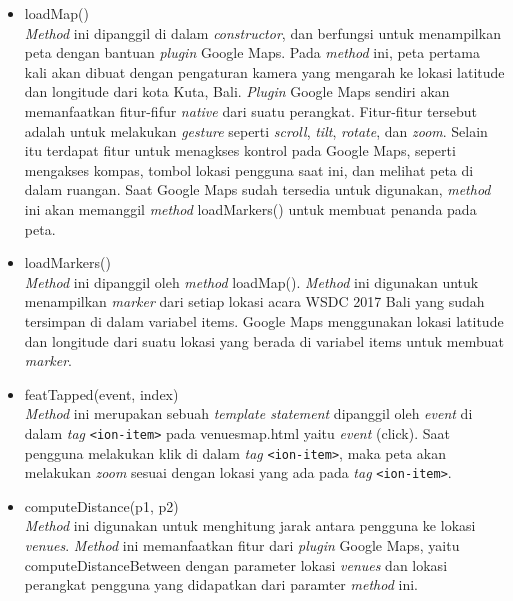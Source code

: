 \begin{enumerate}
\begin{itemize}
		\item loadMap() \\
		\textit{Method} ini dipanggil di dalam \textit{constructor}, dan berfungsi untuk menampilkan peta dengan bantuan \textit{plugin} Google Maps. Pada \textit{method} ini, peta pertama kali akan dibuat dengan pengaturan kamera yang mengarah ke lokasi latitude dan longitude dari kota Kuta, Bali. 	
		\textit{Plugin} Google Maps sendiri akan memanfaatkan fitur-fifur \textit{native} dari suatu perangkat. Fitur-fitur tersebut adalah untuk melakukan \textit{gesture} seperti \textit{scroll}, \textit{tilt}, \textit{rotate}, dan \textit{zoom}. Selain itu terdapat fitur untuk menagkses kontrol pada Google Maps, seperti mengakses kompas, tombol lokasi pengguna saat ini, dan melihat peta di dalam ruangan. Saat Google Maps sudah tersedia untuk digunakan, \textit{method} ini akan memanggil \textit{method} loadMarkers() untuk membuat penanda pada peta.	
		\item loadMarkers() \\
		\textit{Method} ini dipanggil oleh \textit{method} loadMap(). \textit{Method} ini digunakan untuk menampilkan \textit{marker} dari setiap lokasi acara WSDC 2017 Bali yang sudah tersimpan di dalam variabel items. Google Maps menggunakan lokasi latitude dan longitude dari suatu lokasi yang berada di variabel items untuk membuat \textit{marker}.  
		\item featTapped(event, index) \\
		\textit{Method} ini merupakan sebuah \textit{template statement} dipanggil oleh \textit{event} di dalam \textit{tag} \texttt{<ion-item>} pada venues\textunderscore map.html yaitu \textit{event} (click). Saat pengguna melakukan klik di dalam \textit{tag} \texttt{<ion-item>}, maka peta akan melakukan \textit{zoom} sesuai dengan lokasi yang ada pada \textit{tag} \texttt{<ion-item>}.
		\item computeDistance(p1, p2)\\
		\textit{Method} ini digunakan untuk menghitung jarak antara pengguna ke lokasi \textit{venues}. \textit{Method} ini memanfaatkan fitur dari \textit{plugin} Google Maps, yaitu computeDistanceBetween dengan parameter lokasi \textit{venues} dan lokasi perangkat pengguna yang didapatkan dari paramter \textit{method} ini.
	\end{itemize}
	

\end{enumerate}
